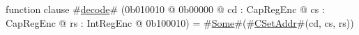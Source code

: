 function clause #\hyperref[sailMIPSzdecode]{decode}# (0b010010 @ 0b00000 @ cd : CapRegEnc @ cs : CapRegEnc @ rs : IntRegEnc @ 0b100010) = #\hyperref[sailMIPSzSome]{Some}#(#\hyperref[sailMIPSzCSetAddr]{CSetAddr}#(cd, cs, rs))
